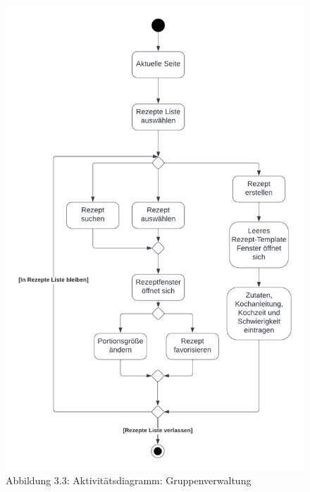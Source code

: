 \documentclass[parskip=full]{scrartcl}
\begin{document}
\begin{figure}[!htp]
    \centering
    \includegraphics{images/section3/Aktivitaetsdiagramm Rezepte Liste.png}\\
    Abbildung 3.3: Aktivitätsdiagramm: Gruppenverwaltung
    \label{fig:A33}
\end{figure}
\newpage
\end{document}
